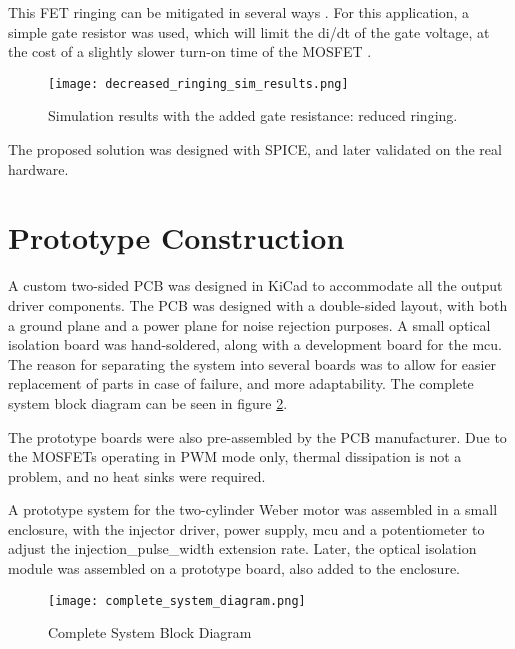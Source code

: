                 This FET ringing can be mitigated in several ways \autocite{toshibaelectronicdevices&storagecorporationParasiticOscillationRinging}. For this application, a simple gate resistor was used, which will limit the di/dt of the gate voltage, at the cost of a slightly slower turn-on time of the MOSFET \autocite{toshibaelectronicdevices&storagecorporationParasiticOscillationRinging}.

                \begin{figure}[H]
                    \centering
                    \texttt{[image: decreased\_ringing\_sim\_results.png]}
                    \caption{Simulation results with the added gate resistance: reduced ringing.}
                    \label{fig:gate_resistor_simulation}
                \end{figure}

                The proposed solution was designed with SPICE, and later validated on the real hardware.


    \section{Prototype Construction}

        A custom two-sided PCB was designed in KiCad to accommodate all the output driver components. The PCB was designed with a double-sided layout, with both a ground plane and a power plane for noise rejection purposes. A small optical isolation board was hand-soldered, along with a development board for the \gls{mcu}. The reason for separating the system into several boards was to allow for easier replacement of parts in case of failure, and more adaptability. The complete system block diagram can be seen in figure \ref{fig:complete_system_block_diagram}.

        The prototype boards were also pre-assembled by the PCB manufacturer. Due to the MOSFETs operating in PWM mode only, thermal dissipation is not a problem, and no heat sinks were required.

        A prototype system for the two-cylinder Weber motor was assembled in a small enclosure, with the injector driver, power supply, \gls{mcu} and a potentiometer to adjust the \gls{injection_pulse_width} extension rate. Later, the optical isolation module was assembled on a prototype board, also added to the enclosure.

        \begin{figure}[H]
            \centering
            \texttt{[image: complete\_system\_diagram.png]}
            \caption{Complete System Block Diagram}
            \label{fig:complete_system_block_diagram}
        \end{figure}

